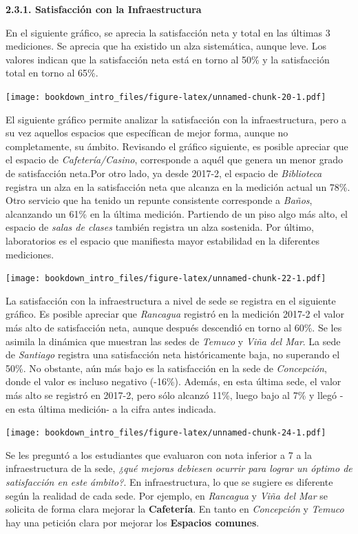 \documentclass[]{book}
\begin{document}
\textbf{2.3.1. Satisfacción con la Infraestructura}

En el siguiente gráfico, se aprecia la satisfacción neta y total en las
últimas 3 mediciones. Se aprecia que ha existido un alza sistemática,
aunque leve. Los valores indican que la satisfacción neta está en torno
al 50\% y la satisfacción total en torno al 65\%.

\texttt{[image: bookdown\_intro\_files/figure-latex/unnamed-chunk-20-1.pdf]}

El siguiente gráfico permite analizar la satisfacción con la
infraestructura, pero a su vez aquellos espacios que específican de
mejor forma, aunque no completamente, su ámbito. Revisando el gráfico
siguiente, es posible apreciar que el espacio de
\emph{Cafetería/Casino}, corresponde a aquél que genera un menor grado
de satisfacción neta.Por otro lado, ya desde 2017-2, el espacio de
\emph{Biblioteca} registra un alza en la satisfacción neta que alcanza
en la medición actual un 78\%. Otro servicio que ha tenido un repunte
consistente corresponde a \emph{Baños}, alcanzando un 61\% en la última
medición. Partiendo de un piso algo más alto, el espacio de \emph{salas
de clases} también registra un alza sostenida. Por último, laboratorios
es el espacio que manifiesta mayor estabilidad en la diferentes
mediciones.

\texttt{[image: bookdown\_intro\_files/figure-latex/unnamed-chunk-22-1.pdf]}

La satisfacción con la infraestructura a nivel de sede se registra en el
siguiente gráfico. Es posible apreciar que \emph{Rancagua} registró en
la medición 2017-2 el valor más alto de satisfacción neta, aunque
después descendió en torno al 60\%. Se les asimila la dinámica que
muestran las sedes de \emph{Temuco} y \emph{Viña del Mar}. La sede de
\emph{Santiago} registra una satisfacción neta históricamente baja, no
superando el 50\%. No obstante, aún más bajo es la satisfacción en la
sede de \emph{Concepción}, donde el valor es incluso negativo (-16\%).
Además, en esta última sede, el valor más alto se registró en 2017-2,
pero sólo alcanzó 11\%, luego bajo al 7\% y llegó -en esta última
medición- a la cifra antes indicada.

\texttt{[image: bookdown\_intro\_files/figure-latex/unnamed-chunk-24-1.pdf]}

Se les preguntó a los estudiantes que evaluaron con nota inferior a 7 a
la infraestructura de la sede, \emph{¿qué mejoras debiesen ocurrir para
lograr un óptimo de satisfacción en este ámbito?}. En infraestructura,
lo que se sugiere es diferente según la realidad de cada sede. Por
ejemplo, en \emph{Rancagua} y \emph{Viña del Mar} se solicita de forma
clara mejorar la \textbf{Cafetería}. En tanto en \emph{Concepción} y
\emph{Temuco} hay una petición clara por mejorar los \textbf{Espacios
comunes}.
\end{document}
